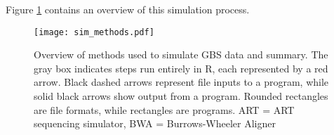 Figure \ref{fig:methods_overview} contains an overview of this simulation process.


\begin{figure}[!ht]
    \centering
    \texttt{[image: sim\_methods.pdf]}
    \caption{Overview of methods used to simulate GBS data and summary. The gray box
        indicates steps run entirely in R, each represented by a red arrow.
        Black dashed arrows represent file inputs to a program, while solid black arrows
        show output from a program.
        Rounded rectangles are file formats, while rectangles are programs.
        ART = ART sequencing simulator, BWA = Burrows-Wheeler Aligner
        }
    \label{fig:methods_overview}
\end{figure}

